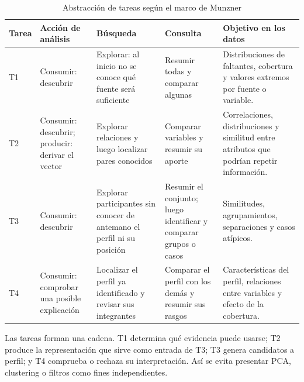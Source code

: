 \documentclass[12pt,a4paper]{article}
\begin{document}
\begin{table}[H]
\centering
\caption{Abstracci\'on de tareas seg\'un el marco de Munzner}
\label{tab:tareas_munzner}
\footnotesize
\renewcommand{\arraystretch}{1.16}
\begin{tabularx}{\textwidth}{p{0.7cm} p{2.25cm} p{2.15cm} p{2.2cm} X}
\toprule
\textbf{Tarea} & \textbf{Acci\'on de an\'alisis} & \textbf{B\'usqueda} & \textbf{Consulta} & \textbf{Objetivo en los datos} \\
\midrule
T1 & Consumir: descubrir & Explorar: al inicio no se conoce qu\'e fuente ser\'a suficiente & Resumir todas y comparar algunas & Distribuciones de faltantes, cobertura y valores extremos por fuente o variable. \\
T2 & Consumir: descubrir; producir: derivar el vector & Explorar relaciones y luego localizar pares conocidos & Comparar variables y resumir su aporte & Correlaciones, distribuciones y similitud entre atributos que podr\'ian repetir informaci\'on. \\
T3 & Consumir: descubrir & Explorar participantes sin conocer de antemano el perfil ni su posici\'on & Resumir el conjunto; luego identificar y comparar grupos o casos & Similitudes, agrupamientos, separaciones y casos at\'ipicos. \\
T4 & Consumir: comprobar una posible explicaci\'on & Localizar el perfil ya identificado y revisar sus integrantes & Comparar el perfil con los dem\'as y resumir sus rasgos & Caracter\'isticas del perfil, relaciones entre variables y efecto de la cobertura. \\
\bottomrule
\end{tabularx}
\renewcommand{\arraystretch}{1}
\end{table}

Las tareas forman una cadena. T1 determina qu\'e evidencia puede usarse; T2 produce la representaci\'on que sirve como entrada de T3; T3 genera candidatos a perfil; y T4 comprueba o rechaza su interpretaci\'on. As\'i se evita presentar PCA, clustering o filtros como fines independientes.
\end{document}
